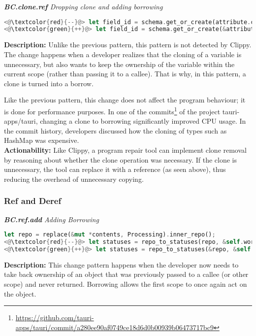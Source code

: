 \noindent\textit{\textbf{BC.clone.ref} Dropping clone and adding borrowing}

\begin{lstlisting}[language=Rust, style=colouredRust]
<@\textcolor{red}{--}@> let field_id = schema.get_or_create(attribute.clone())?;
<@\textcolor{green}{++}@> let field_id = schema.get_or_create(&attribute)?;
\end{lstlisting}

\noindent\textbf{Description:} Unlike the previous pattern, this pattern is not detected by Clippy. The change happens when a developer realizes that the cloning of a variable is unnecessary, but also wants to keep the ownership of the variable within the current scope (rather than passing it to a callee). That is why, in this pattern, a clone is turned into a borrow. 

Like the previous pattern, this change does not affect the program behaviour; it is done for performance purposes. In one of the commits\footnote{\scriptsize \url{https://github.com/tauri-apps/tauri/commit/a280ee90af0749ce18d6d0b00939b06473717bc9}} of the project tauri-apps/tauri, changing a clone to borrowing significantly improved CPU usage. In the commit history, developers discussed how the cloning of types such as HashMap was expensive. \\

\noindent\textbf{Actionability:} Like Clippy, a program repair tool can implement clone removal by reasoning about whether the clone operation was necessary. If the clone is unnecessary, the tool can replace it with a reference (as seen above), thus reducing the overhead of unnecessary copying. \\

\subsubsection{Ref and Deref}

\noindent\textit{\textbf{BC.ref.add} Adding Borrowing}

\begin{lstlisting}[language=Rust, style=colouredRust]
let repo = replace(&mut *contents, Processing).inner_repo();
<@\textcolor{red}{--}@> let statuses = repo_to_statuses(repo, &self.workdir);
<@\textcolor{green}{++}@> let statuses = repo_to_statuses(&repo, &self.workdir);
\end{lstlisting}

\noindent\textbf{Description:} This change pattern happens when the developer now needs to take back ownership of an object that was previously passed to a callee (or other scope) and never returned. Borrowing allows the first scope to once again act on the object.

